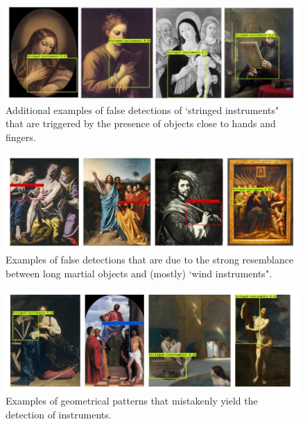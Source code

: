 \begin{figure}[ht!]
\centering
  \includegraphics[width=\linewidth]{./Images/Chapter05/false_positives_4}
  \caption{Additional examples of false detections of `stringed instruments" that are triggered by the presence of objects close to hands and fingers.}
  \label{fig:false_positives_4}
\end{figure}

\begin{figure}[ht!]
\centering
  \includegraphics[width=\linewidth]{./Images/Chapter05/false_positives_2}
  \caption{Examples of false detections that are due to the strong resemblance between long martial objects and (mostly) `wind instruments".}
  \label{fig:false_positives_2}
\end{figure}


\begin{figure}[ht!]
\centering
  \includegraphics[width=\linewidth]{./Images/Chapter05/false_positives_3}
  \caption{Examples of geometrical patterns that mistakenly yield the detection of instruments.}
  \label{fig:false_positives_3}
\end{figure}



